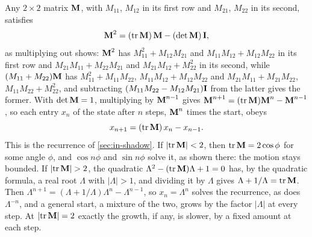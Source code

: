 \begin{toolbox}
Any $2\times2$ matrix $\bm{\mathrm{M}}$, with $M_{11}$, $M_{12}$ in its first row
and $M_{21}$, $M_{22}$ in its second, satisfies
\begin{equation*}
   \bm{\mathrm{M}}^2 = (\operatorname{tr}\bm{\mathrm{M}})\,\bm{\mathrm{M}} - (\det\bm{\mathrm{M}})\,\bm{\mathrm{I}} ,
\end{equation*}
as multiplying out shows: $\bm{\mathrm{M}}^2$ has $M_{11}^2 + M_{12}M_{21}$ and
$M_{11}M_{12} + M_{12}M_{22}$ in its first row and $M_{21}M_{11} +
M_{22}M_{21}$ and $M_{21}M_{12} + M_{22}^2$ in its second, while $(M_{11}
+ M_{22})\bm{\mathrm{M}}$ has $M_{11}^2 + M_{11}M_{22}$, $M_{11}M_{12} +
M_{12}M_{22}$ and $M_{21}M_{11} + M_{21}M_{22}$, $M_{11}M_{22} +
M_{22}^2$, and subtracting $(M_{11}M_{22} - M_{12}M_{21})\bm{\mathrm{I}}$ from the
latter gives the former. With $\det\bm{\mathrm{M}} = 1$, multiplying by
$\bm{\mathrm{M}}^{n-1}$ gives $\bm{\mathrm{M}}^{n+1} = (\operatorname{tr}\bm{\mathrm{M}})\bm{\mathrm{M}}^n -
\bm{\mathrm{M}}^{n-1}$, so each entry $x_n$ of the state after $n$ steps,
$\bm{\mathrm{M}}^n$ times the start, obeys
\begin{equation*}
   x_{n+1} = (\operatorname{tr}\bm{\mathrm{M}})\,x_n - x_{n-1} .
\end{equation*}
This is the recurrence of \cref{sec:in-shadow}. If
$\lvert\operatorname{tr}\bm{\mathrm{M}}\rvert < 2$, then $\operatorname{tr}\bm{\mathrm{M}} =
2\cos\phi$ for some angle $\phi$, and $\cos n\phi$ and $\sin n\phi$ solve
it, as shown there: the motion stays bounded. If
$\lvert\operatorname{tr}\bm{\mathrm{M}}\rvert > 2$, the quadratic $\Lambda^2 -
(\operatorname{tr}\bm{\mathrm{M}})\Lambda + 1 = 0$ has, by the quadratic formula, a
real root $\Lambda$ with $\lvert\Lambda\rvert > 1$, and dividing it by
$\Lambda$ gives $\Lambda + 1/\Lambda = \operatorname{tr}\bm{\mathrm{M}}$. Then
$\Lambda^{n+1} = (\Lambda + 1/\Lambda)\Lambda^n - \Lambda^{n-1}$, so $x_n =
\Lambda^n$ solves the recurrence, as does $\Lambda^{-n}$, and a general
start, a mixture of the two, grows by the factor $\lvert\Lambda\rvert$ at
every step. At $\lvert\operatorname{tr}\bm{\mathrm{M}}\rvert = 2$ exactly the growth,
if any, is slower, by a fixed amount at each step.
\end{toolbox}

